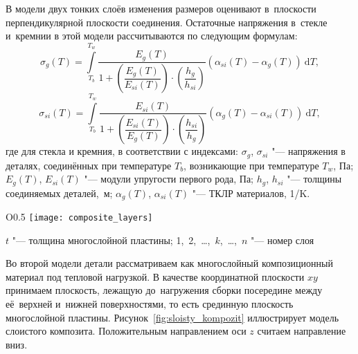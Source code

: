 В модели двух тонких слоёв изменения размеров оценивают в~плоскости перпендикулярной
плоскости соединения.
Остаточные напряжения в~стекле и~кремнии в этой модели рассчитываются по следующим формулам:%
\[
    \sigma_g(T)
    =
    \int\limits_{T_b}^{T_w}
    \frac{E_g(T)}%
        {1 +
            \left(
                \dfrac{E_g(T)}{E_{si}(T)}
            \right)
        \cdot
            \left(
                \dfrac{h_g}{h_{si}}
            \right)
        }
    (
        \alpha_{si}(T) - \alpha_g(T)
    )
    \:\mathrm{d}T,
\]
\begin{equation*}
    \label{eq:sigma_siupdated}
    \sigma_{si}(T)
    =
    \int\limits_{T_b}^{T_w}
    \frac{E_{si}(T)}%
        {1 +
            \left(
                \dfrac{E_{si}(T)}{E_g(T)}
            \right)
        \cdot
            \left(
                \dfrac{h_{si}}{h_g}
            \right)
        }
    (
         \alpha_g(T) - \alpha_{si}(T)
    )
    \:\mathrm{d}T,
\end{equation*}
где для стекла и кремния, в соответствии с индексами:
$\sigma_g$,  $\sigma_{si}$ "--- напряжения в деталях, соединённых при температуре  $T_b$, возникающие при температуре  $T_w$, Па;
$E_g(T)$,  $E_{si}(T)$ "--- модули упругости первого рода, Па;
$h_g$,  $h_{si}$ "--- толщины соединяемых деталей,~м;
\(\alpha_g(T)\), \(\alpha_{si}(T)\) "--- ТКЛР материалов, 1/K.

\setlength\intextsep{0em}%
\begin{wrapfigure}[12]{O}{0.5\textwidth}
    \texttt{[image: composite\_layers]}

    \caption{Иллюстрация модели слоистого композита:}
    \label{fig:sloisty_kompozit}
    $t$ "--- толщина многослойной пластины; \mbox{1, 2, \dots, $k$, \dots, $n$} "--- номер слоя
\end{wrapfigure}

Во второй модели
детали рассматриваем как многослойный композиционный материал
под тепловой нагрузкой.
В качестве координатной плоскости $xy$ принимаем плоскость,
лежащую до~нагружения сборки посередине между её~верхней и~нижней
поверхностями, то есть срединную
плоскость многослойной пластины.
Рисунок~\ref{fig:sloisty_kompozit} иллюстрирует модель слоистого композита.
Положительным направлением оси $z$ считаем направление вниз.

